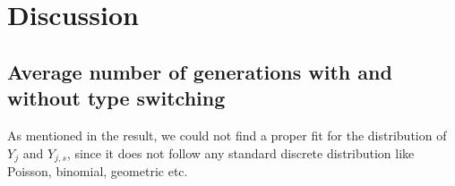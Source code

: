 \section{Discussion}
\subsection{Average number of generations with and without type switching}
As mentioned in the result, we could not find a proper fit for the distribution of $Y_{j}$ and $Y_{j,s}$, since it does not follow any standard discrete distribution like Poisson, binomial, geometric etc. 